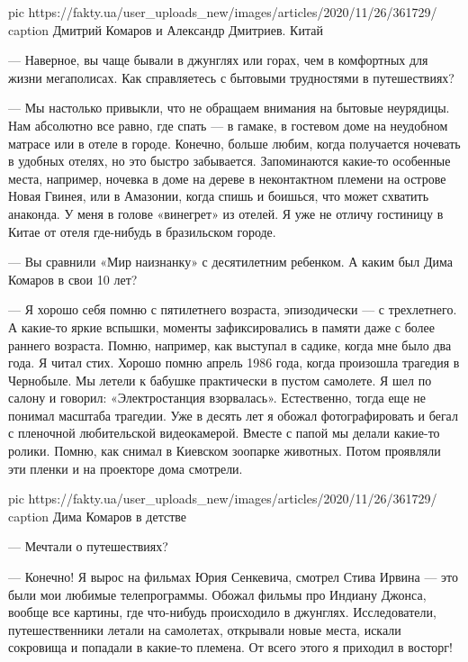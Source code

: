 \ifcmt
pic https://fakty.ua/user_uploads_new/images/articles/2020/11/26/361729/%
caption Дмитрий Комаров и Александр Дмитриев. Китай
\fi

--- Наверное, вы чаще бывали в джунглях или горах, чем в комфортных для
жизни мегаполисах. Как справляетесь с бытовыми трудностями в путешествиях?

--- Мы настолько привыкли, что не обращаем внимания на бытовые неурядицы.
Нам абсолютно все равно, где спать --- в гамаке, в гостевом доме
на неудобном матрасе или в отеле в городе. Конечно, больше любим, когда
получается ночевать в удобных отелях, но это быстро забывается.
Запоминаются какие-то особенные места, например, ночевка в доме на дереве
в неконтактном племени на острове Новая Гвинея, или в Амазонии, когда
спишь и боишься, что может схватить анаконда. У меня в голове «винегрет»
из отелей. Я уже не отличу гостиницу в Китае от отеля где-нибудь
в бразильском городе.

--- Вы сравнили «Мир наизнанку» с десятилетним ребенком. А каким был Дима
Комаров в свои 10 лет?

--- Я хорошо себя помню с пятилетнего возраста, эпизодически —
с трехлетнего. А какие-то яркие вспышки, моменты зафиксировались в памяти
даже с более раннего возраста. Помню, например, как выступал в садике,
когда мне было два года. Я читал стих. Хорошо помню апрель 1986 года,
когда произошла трагедия в Чернобыле. Мы летели к бабушке практически
в пустом самолете. Я шел по салону и говорил: «Электростанция взорвалась».
Естественно, тогда еще не понимал масштаба трагедии. Уже в десять лет
я обожал фотографировать и бегал с пленочной любительской видеокамерой.
Вместе с папой мы делали какие-то ролики. Помню, как снимал в Киевском
зоопарке животных. Потом проявляли эти пленки и на проекторе дома
смотрели.

\ifcmt
pic https://fakty.ua/user_uploads_new/images/articles/2020/11/26/361729/%
caption  Дима Комаров в детстве
\fi

--- Мечтали о путешествиях?

--- Конечно! Я вырос на фильмах Юрия Сенкевича, смотрел Стива Ирвина --- это
были мои любимые телепрограммы. Обожал фильмы про Индиану Джонса, вообще
все картины, где что-нибудь происходило в джунглях. Исследователи,
путешественники летали на самолетах, открывали новые места, искали
сокровища и попадали в какие-то племена. От всего этого я приходил
в восторг!

